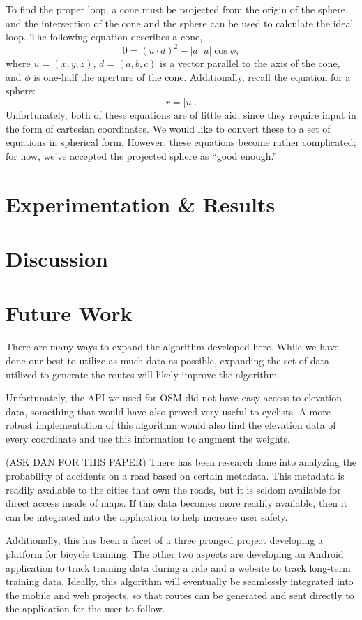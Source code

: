 \documentclass[twocolumn,11pt]{article}
\begin{document}
To find the proper loop, a cone must be projected from the origin of the sphere,
and the intersection of the cone and the sphere can be used to calculate the
ideal loop. The following equation describes a cone,
\[ 0 = (u \cdot d)^2 - |d||u|\cos \phi , \]
where $u= (x,y,z)$, $d = (a,b,c)$ is a vector parallel to the axis of the
cone, and $\phi$ is one-half the aperture of the cone. Additionally, recall
the equation for a sphere:
\[ r = |u|. \]
Unfortunately, both of these equations are of little aid, since they require
input in the form of cartesian coordinates. We would like to convert these to
a set of equations in spherical form. However, these equations become rather
complicated; for now, we've accepted the projected sphere as ``good enough.''


\section{Experimentation \& Results}

\section{Discussion}

\section{Future Work}

There are many ways to expand the algorithm developed here. While we have done
our best to utilize as much data as possible, expanding the set of data utilized
to generate the routes will likely improve the algorithm.

Unfortunately, the API we used for OSM did not have easy access to elevation
data, something that would have also proved very useful to cyclists. A more
robust implementation of this algorithm would also find the elevation data of
every coordinate and use this information to augment the weights.

 (ASK DAN FOR THIS
PAPER) There has been research done into analyzing the probability of accidents
on a road based on certain metadata. This metadata is readily available to the
cities that own the roads, but it is seldom available for direct access inside
of maps. If this data becomes more readily available, then it can be integrated
into the application to help increase user safety.

Additionally, this has been a facet of a three pronged project developing a
platform for bicycle training. The other two aspects are developing an Android
application to track training data during a ride and a website to track
long-term training data. Ideally, this algorithm will eventually be seamlessly
integrated into the mobile and web projects, so that routes can be generated
and sent directly to the application for the user to follow.
\end{document}
